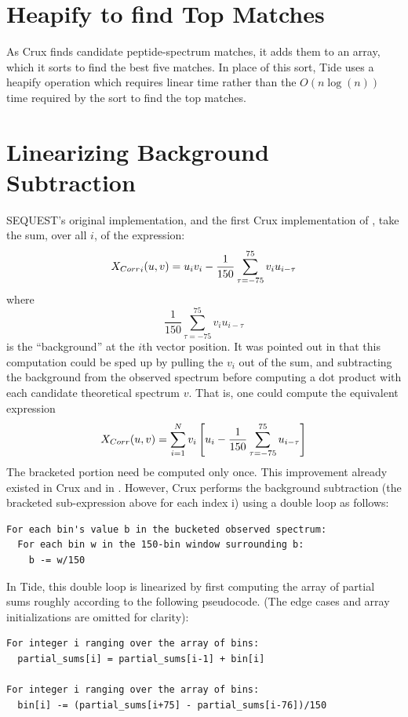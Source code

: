 \section{Heapify to find Top Matches}

As Crux finds candidate peptide-spectrum matches, it adds them to an
array, which it sorts to find the best five matches. In place
of this sort, Tide uses a heapify operation which requires linear time
rather than the $O(n \log(n))$ time required by the sort to find the top
matches.

\section{Linearizing Background Subtraction \label{subsubsection:linearize-bkgnd-sub}}

SEQUEST's original implementation, and the first Crux implementation
of \XCorr, take the sum, over all $i$, of the expression:
\[
\mbox{\ensuremath{X_{Corr}}}_i(u,v)=u_iv_i-\frac{1}{150}\sum_{\tau=-75}^{75}{v_iu_{i-\tau}}
\]
where
\[\frac{1}{150}\sum_{\tau=-75}^{75}{v_iu_{i-\tau}}\]
is the ``background'' at the $i$th vector position. It was pointed
out in \cite{eng:fast} that this computation could be sped up by
pulling the $v_i$ out of the sum, and subtracting the background from the
observed spectrum before computing a dot product with each candidate
theoretical spectrum $v$. That is, one could compute the equivalent
expression
\[
X_{Corr}(u,v)=\sum_{i=1}^{N}{v_i\left[u_i-\frac{1}{150}\sum_{\tau=-75}^{75}{u_{i-\tau}}\right]}
\]
The bracketed portion need be computed only once. This improvement
already existed in Crux and in \tidezero. However, Crux performs the
background subtraction (the bracketed sub-expression above for each
index i) using a double loop as follows:

\begin{verbatim}
For each bin's value b in the bucketed observed spectrum:
  For each bin w in the 150-bin window surrounding b:
    b -= w/150
\end{verbatim}

In Tide, this double loop is linearized by first computing the array
of partial sums roughly according to the following pseudocode. (The
edge cases and array initializations are omitted for clarity):

\begin{verbatim}
For integer i ranging over the array of bins:
  partial_sums[i] = partial_sums[i-1] + bin[i]

For integer i ranging over the array of bins:
  bin[i] -= (partial_sums[i+75] - partial_sums[i-76])/150
\end{verbatim}

